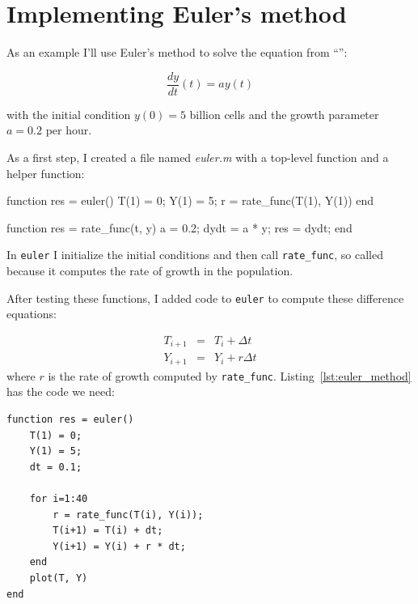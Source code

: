 

\section{Implementing Euler's method}

As an example I'll use Euler's method to solve the equation from ``'':

\[ \frac{dy}{dt}(t) = a y(t) \]

with the initial condition $y(0) = 5$ billion cells and
the growth parameter $a = 0.2$ per hour. 


As a first step, I created a file named {\em euler.m} with a top-level function and a helper function:

\begin{code}
function res = euler()
    T(1) = 0;
    Y(1) = 5;
    r = rate_func(T(1), Y(1))
end

function res = rate_func(t, y)
   a = 0.2;
   dydt = a * y;
   res = dydt;
end
\end{code}

In {\tt euler} I initialize the initial conditions and then call \verb"rate_func", so called because it computes the rate of growth in the population.


After testing these functions, I added code to {\tt euler} to compute these difference equations:

\begin{eqnarray}
T_{i+1} &=& T_i + \Delta t             \\
Y_{i+1} &=& Y_i + r \Delta t          
\end{eqnarray}
%
where $r$ is the rate of growth computed by \verb"rate_func".
Listing~\ref{lst:euler_method} has the code we need:

\begin{lstlisting}[caption={A function implementing Euler's method}, label={lst:euler_method}]
function res = euler()
    T(1) = 0;
    Y(1) = 5;
    dt = 0.1;
    
    for i=1:40
        r = rate_func(T(i), Y(i));
        T(i+1) = T(i) + dt;
        Y(i+1) = Y(i) + r * dt;
    end
    plot(T, Y)
end
\end{lstlisting}

